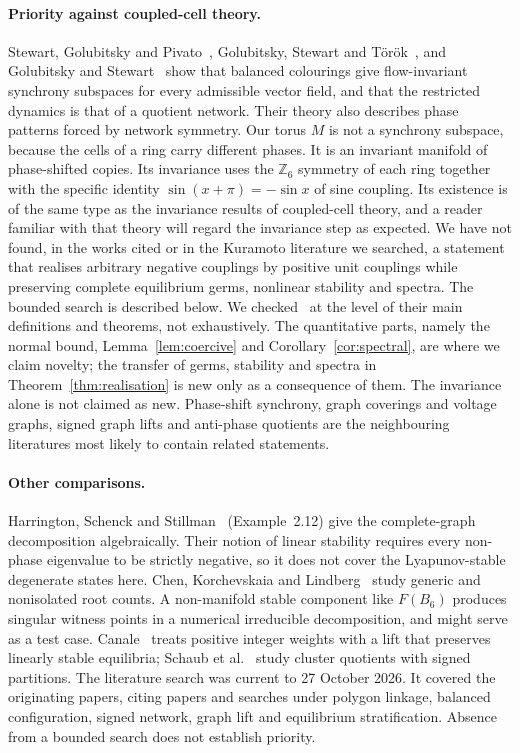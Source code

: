 \documentclass[11pt,a4paper]{article}
\theoremstyle{definition}\newtheorem{conjecture}{Conjecture}
\theoremstyle{remark}\newtheorem{remark}[theorem]{Remark}
\newcommand{\Z}{\mathbb Z}
\begin{document}
\paragraph{Priority against coupled-cell theory.} Stewart, Golubitsky and Pivato~\cite{sgp}, Golubitsky, Stewart and T\"or\"ok~\cite{gst}, and Golubitsky and Stewart~\cite{gs} show that balanced colourings give flow-invariant synchrony subspaces for every admissible vector field, and that the restricted dynamics is that of a quotient network. Their theory also describes phase patterns forced by network symmetry. Our torus $M$ is not a synchrony subspace, because the cells of a ring carry different phases. It is an invariant manifold of phase-shifted copies. Its invariance uses the $\Z_6$ symmetry of each ring together with the specific identity $\sin(x+\pi)=-\sin x$ of sine coupling. Its existence is of the same type as the invariance results of coupled-cell theory, and a reader familiar with that theory will regard the invariance step as expected. We have not found, in the works cited or in the Kuramoto literature we searched, a statement that realises arbitrary negative couplings by positive unit couplings while preserving complete equilibrium germs, nonlinear stability and spectra. The bounded search is described below. We checked~\cite{sgp,gst,gs} at the level of their main definitions and theorems, not exhaustively. The quantitative parts, namely the normal bound, Lemma~\ref{lem:coercive} and Corollary~\ref{cor:spectral}, are where we claim novelty; the transfer of germs, stability and spectra in Theorem~\ref{thm:realisation} is new only as a consequence of them. The invariance alone is not claimed as new. Phase-shift synchrony, graph coverings and voltage graphs, signed graph lifts and anti-phase quotients are the neighbouring literatures most likely to contain related statements.

\paragraph{Other comparisons.} Harrington, Schenck and Stillman~\cite{hss} (Example~2.12) give the complete-graph decomposition algebraically. Their notion of linear stability requires every non-phase eigenvalue to be strictly negative, so it does not cover the Lyapunov-stable degenerate states here. Chen, Korchevskaia and Lindberg~\cite{chen} study generic and nonisolated root counts. A non-manifold stable component like $F(B_6)$ produces singular witness points in a numerical irreducible decomposition, and might serve as a test case. Canale~\cite{canale} treats positive integer weights with a lift that preserves linearly stable equilibria; Schaub et al.~\cite{schaub} study cluster quotients with signed partitions. The literature search was current to 27 October 2026. It covered the originating papers, citing papers and searches under polygon linkage, balanced configuration, signed network, graph lift and equilibrium stratification. Absence from a bounded search does not establish priority.
\end{document}
